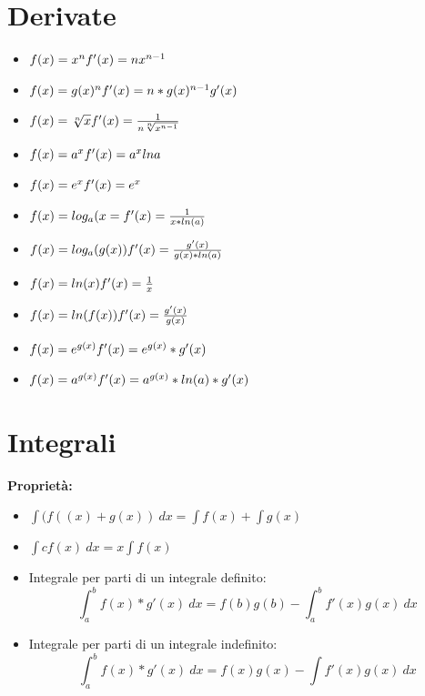 \documentclass[14pt]{extreport}
\begin{document}
\section{Derivate}

\begin{itemize}
	\item $f(x) = x^n \\f'(x)=nx^{n-1}$
	\item $f(x) = g(x)^n \\f'(x)= n*g(x)^{n-1}g'(x)$
	\item $f(x) = \sqrt[n]{x}  \\ f'(x)=\frac{1}{n\sqrt[n]{x^{n-1}}}$
	\item $f(x) = a^x  \\f'(x)= a^xlna$
	\item $f(x) = e^x \\f'(x)= e^x$
	\item $f(x) = log_a(x= \\f'(x)= \frac{1}{x*ln(a)}$
	\item $f(x) = log_a(g(x)) \\f'(x) = \frac{g'(x)}{g(x)*ln(a)}$
	\item $f(x) = ln(x) \\f'(x)=\frac{1}{x}$
	\item $f(x) = ln(f(x)) \\f'(x) = \frac{g'(x)}{g(x)}$
	\item $f(x) = e^{g(x)} \\f'(x) = e^{g(x)}*g'(x)$
	\item $f(x) = a^{g(x)} \\f'(x) = a^{g(x)}*ln(a)*g'(x)$
\end{itemize}

\section{Integrali}

\textbf{Proprietà:}

\begin{itemize}
	\item $\int (f((x)+g(x)) \ dx = \int f(x) + \int g(x)$
	\item $\int cf(x) \ dx =x\int f(x)$
	\item Integrale per parti di un integrale definito: \\
	      $$\int_a^b f(x)*g'(x) \ dx = f(b)g(b) - \int_a^bf'(x)g(x) \ dx$$
	\item Integrale per parti di un integrale indefinito: $$\int_a^b f(x)*g'(x) \ dx = f(x)g(x) - \int f'(x)g(x) \ dx$$
\end{itemize}
\end{document}
